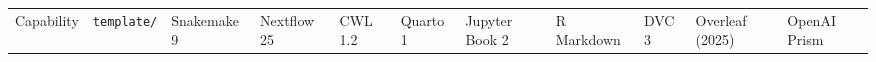 \documentclass[
]{article}
\newcounter{none} %
\begin{document}
{\def\LTcaptype{none} %
\begin{longtable}[]{@{}
  >{\raggedright\arraybackslash}p{}
  >{\centering\arraybackslash}p{}
  >{\centering\arraybackslash}p{}
  >{\centering\arraybackslash}p{}
  >{\centering\arraybackslash}p{}
  >{\centering\arraybackslash}p{}
  >{\centering\arraybackslash}p{}
  >{\centering\arraybackslash}p{}
  >{\centering\arraybackslash}p{}
  >{\centering\arraybackslash}p{}
  >{\centering\arraybackslash}p{}@{}}
\toprule\noalign{}
\begin{minipage}[b]{\linewidth}\raggedright
Capability
\end{minipage} & \begin{minipage}[b]{\linewidth}\centering
\texttt{template/}
\end{minipage} & \begin{minipage}[b]{\linewidth}\centering
Snakemake 9
\end{minipage} & \begin{minipage}[b]{\linewidth}\centering
Nextflow 25
\end{minipage} & \begin{minipage}[b]{\linewidth}\centering
CWL 1.2
\end{minipage} & \begin{minipage}[b]{\linewidth}\centering
Quarto 1
\end{minipage} & \begin{minipage}[b]{\linewidth}\centering
Jupyter Book 2
\end{minipage} & \begin{minipage}[b]{\linewidth}\centering
R Markdown
\end{minipage} & \begin{minipage}[b]{\linewidth}\centering
DVC 3
\end{minipage} & \begin{minipage}[b]{\linewidth}\centering
Overleaf (2025)
\end{minipage} & \begin{minipage}[b]{\linewidth}\centering
OpenAI Prism
\end{minipage} \\

\end{longtable}}
\end{document}
